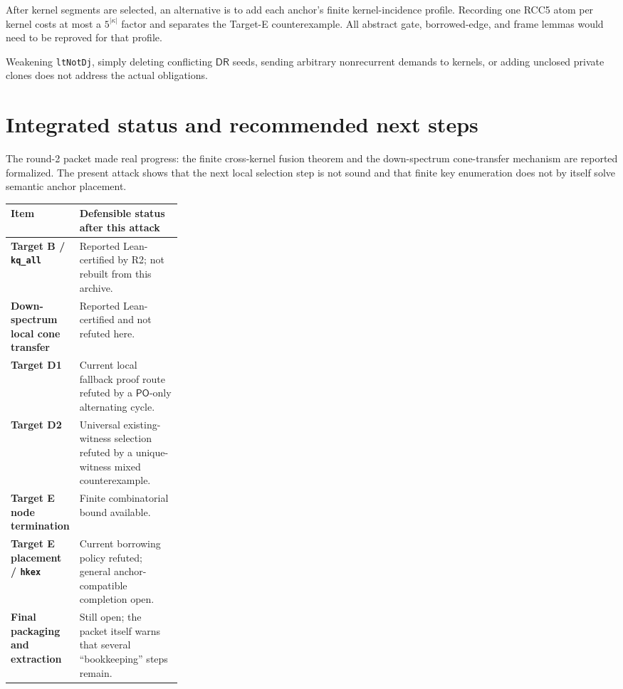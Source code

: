 \documentclass[11pt]{article}
\newcommand{\PO}{\mathsf{PO}}
\newcommand{\DR}{\mathsf{DR}}
\begin{document}
After kernel segments are selected, an alternative is to add each anchor's finite
kernel-incidence profile. Recording one RCC5 atom per kernel costs at most a
$5^{|\kappa|}$ factor and separates the Target-E counterexample. All abstract gate,
borrowed-edge, and frame lemmas would need to be reproved for that profile.

Weakening \texttt{ltNotDj}, simply deleting conflicting $\DR$ seeds, sending arbitrary
nonrecurrent demands to kernels, or adding unclosed private clones does not address the
actual obligations.

\section{Integrated status and recommended next steps}

The round-2 packet made real progress: the finite cross-kernel fusion theorem and the
down-spectrum cone-transfer mechanism are reported formalized. The present attack shows
that the next local selection step is not sound and that finite key enumeration does not
by itself solve semantic anchor placement.

\begin{center}
\renewcommand{\arraystretch}{1.25}
\begin{tabularx}{\linewidth}{>{\bfseries}p{0.28\linewidth}X}
\toprule
Item & Defensible status after this attack \\
\midrule
Target B / \texttt{kq\_all} & Reported Lean-certified by R2; not rebuilt from this
archive. \\
Down-spectrum local cone transfer & Reported Lean-certified and not refuted here. \\
Target D1 & Current local fallback proof route refuted by a $\PO$-only alternating
cycle. \\
Target D2 & Universal existing-witness selection refuted by a unique-witness mixed
counterexample. \\
Target E node termination & Finite combinatorial bound available. \\
Target E placement / \texttt{hkex} & Current borrowing policy refuted; general
anchor-compatible completion open. \\
Final packaging and extraction & Still open; the packet itself warns that several
``bookkeeping'' steps remain. \\
\bottomrule
\end{tabularx}
\end{center}
\end{document}
